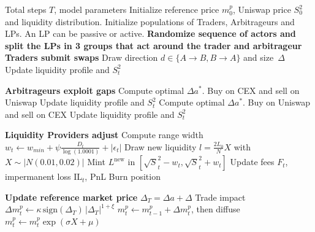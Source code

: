 \documentclass[a4paper,11pt]{article}
\begin{document}
\begin{algorithm}[H]
\caption{First sketch of ABM for Uniswap v3}\label{alg:abmv3}
\begin{algorithmic}[1]
  \Require Total steps $T$, model parameters
  \State Initialize reference price $m^p_0$, Uniswap price $S^2_0$ and liquidity distribution.
  \State Initialize populations of Traders, Arbitrageurs and LPs. An LP can be passive or active.
  \State \textbf{Randomize sequence of actors and split the LPs in 3 groups that act around the trader and arbitrageur} \smallskip
  \State \textbf{Traders submit swaps}
      \State Draw direction $d\in\{A\!\to\!B,B\!\to\!A\}$ and size~$\Delta$
        \State {}
        \State Update liquidity profile and $S^2_t$
      \EndIf
    \EndFor
    \smallskip

    \State \textbf{Arbitrageurs exploit gaps}
        \State Compute optimal $\Delta a^*$. Buy on CEX and sell on Uniswap
        \State Update liquidity profile and $S^2_t$
        \State Compute optimal $\Delta a^*$. Buy on Uniswap and sell on CEX
        \State Update liquidity profile and $S^2_t$
      \EndIf
    \EndFor
    \smallskip


    \State \textbf{Liquidity Providers adjust}
      \State Compute range width 
        $w_t \gets  w_{min} + \psi \frac{D_t}{\log(1.0001)} + |\epsilon_t|$
      \State Draw new liquidity $l=\frac{2L_0}{N}X$ with $X\sim|N(0.01,0.02)|$
        \State Mint $L^\mathrm{new}$ in $[\sqrt S^2_t-w_t,\sqrt S^2_t+w_t]$
      \EndIf
      \State Update fees $F_t$, impermanent loss $\text{IL}_t$, PnL
        \State Burn position
      \EndIf
    \EndFor
    \smallskip

    \State \textbf{Update reference market price}
    \State $\Delta_T = \Delta a + \Delta$
    \State Trade impact
      $\Delta m^p_t \gets \kappa\,\mathrm{sign}(\Delta_T)\,|\Delta_T|^{1+\xi}$
    \State $m^p_t \gets m^p_{t-1} + \Delta m^p_t$, then diffuse
      $m^p_t \gets m^p_t\exp(\sigma X + \mu)$
    \smallskip

  \EndFor
\end{algorithmic}
\nonumber
\end{algorithm}
\end{document}
